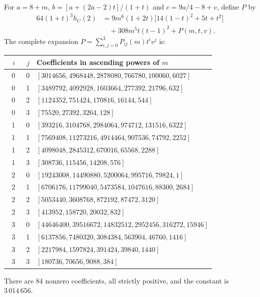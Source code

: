 For $a=8+m$, $b=[a+(2a-2)t]/(1+t)$ and $c=9a/4-8+v$,
define $P$ by
\begin{align*}
64(1+t)^3h_C(2)
 &=9m^6(1+2t)\bigl[14(1-t)^2+5t+t^2\bigr]\\
 &\quad+308m^5t(t-1)^2+P(m,t,v).
\end{align*}
The complete expansion $P=\sum_{i,j=0}^3 P_{ij}(m)t^iv^j$ is:
\begin{center}
\footnotesize
\setlength{\tabcolsep}{4pt}
\begin{tabular}{rrp{0.86\linewidth}}
\toprule
$i$ & $j$ & Coefficients in ascending powers of $m$ \\
\midrule
0 & 0 & $[3014656,\allowbreak 4968448,\allowbreak 2878080,\allowbreak 766780,\allowbreak 100060,\allowbreak 6027]$ \\
0 & 1 & $[3489792,\allowbreak 4092928,\allowbreak 1603664,\allowbreak 277392,\allowbreak 21796,\allowbreak 632]$ \\
0 & 2 & $[1124352,\allowbreak 751424,\allowbreak 170816,\allowbreak 16144,\allowbreak 544]$ \\
0 & 3 & $[75520,\allowbreak 27392,\allowbreak 3264,\allowbreak 128]$ \\
1 & 0 & $[393216,\allowbreak 3104768,\allowbreak 2984064,\allowbreak 974712,\allowbreak 131516,\allowbreak 6322]$ \\
1 & 1 & $[7569408,\allowbreak 11273216,\allowbreak 4914464,\allowbreak 907536,\allowbreak 74792,\allowbreak 2252]$ \\
1 & 2 & $[4098048,\allowbreak 2845312,\allowbreak 670016,\allowbreak 65568,\allowbreak 2288]$ \\
1 & 3 & $[308736,\allowbreak 115456,\allowbreak 14208,\allowbreak 576]$ \\
2 & 0 & $[19243008,\allowbreak 14490880,\allowbreak 5200064,\allowbreak 995716,\allowbreak 79824,\allowbreak 1]$ \\
2 & 1 & $[6706176,\allowbreak 11799040,\allowbreak 5473584,\allowbreak 1047616,\allowbreak 88300,\allowbreak 2684]$ \\
2 & 2 & $[5053440,\allowbreak 3608768,\allowbreak 872192,\allowbreak 87472,\allowbreak 3120]$ \\
2 & 3 & $[413952,\allowbreak 158720,\allowbreak 20032,\allowbreak 832]$ \\
3 & 0 & $[44646400,\allowbreak 39516672,\allowbreak 14832512,\allowbreak 2952456,\allowbreak 316272,\allowbreak 15946]$ \\
3 & 1 & $[6137856,\allowbreak 7480320,\allowbreak 3084384,\allowbreak 563904,\allowbreak 46760,\allowbreak 1416]$ \\
3 & 2 & $[2217984,\allowbreak 1597824,\allowbreak 391424,\allowbreak 39840,\allowbreak 1440]$ \\
3 & 3 & $[180736,\allowbreak 70656,\allowbreak 9088,\allowbreak 384]$ \\
\bottomrule
\end{tabular}
\end{center}
There are $84$ nonzero coefficients, all strictly positive, and the
constant is $3\,014\,656$.

